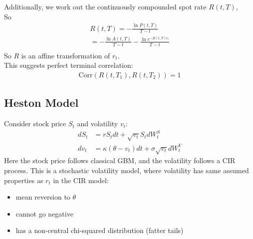 Additionally, we work out the continuously compounded spot rate $R(t, T)$,\\
So
\begin{align*}
    R(t, T) = -\frac{\ln P(t, T)}{T-t} \\
    = - \frac{\ln A(t, T)}{T-t} - \frac{\ln e^{-B(t, T)r_t}}{T-t}\\
\end{align*}
So $R$ is an affine transformation of $r_t$.\\
This suggests perfect terminal correlation:
\begin{align*}
    \text{Corr}(R(t, T_1), R(t, T_2)) = 1
\end{align*}

\subsection{Heston Model}
Consider stock price $S_t$ and volatility $v_t$:
\begin{align*}
    dS_t &= r S_t dt + \sqrt{v_t} S_t dW_t^S\\
    dv_t &= \kappa(\theta - v_t) dt + \sigma \sqrt{v_t} dW_t^V
\end{align*}
Here the stock price follows classical GBM, and 
the volatility follows a CIR process. 
This is a stochastic volatility model, where volatility has same assumed
properties as $r_t$ in the CIR model: \\
\begin{itemize}
    \item mean reversion to $\theta$
    \item cannot go negative
    \item has a non-central chi-squared distribution (fatter tails)
\end{itemize}


